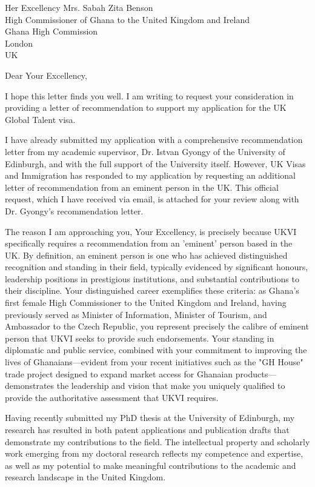 \documentclass[12pt,a4paper]{letter}
\begin{document}
\begin{letter}{Her Excellency Mrs. Sabah Zita Benson\\High Commissioner of Ghana to the United Kingdom and Ireland\\Ghana High Commission\\London\\UK}

\date{\today}

\opening{Dear Your Excellency,}

I hope this letter finds you well. I am writing to request your consideration in providing a letter of recommendation to support my application for the UK Global Talent visa.

I have already submitted my application with a comprehensive recommendation letter from my academic supervisor, Dr. Istvan Gyongy of the University of Edinburgh, and with the full support of the University itself. However, UK Visas and Immigration has responded to my application by requesting an additional letter of recommendation from an eminent person in the UK. This official request, which I have received via email, is attached for your review along with Dr. Gyongy's recommendation letter.

The reason I am approaching you, Your Excellency, is precisely because UKVI specifically requires a recommendation from an 'eminent' person based in the UK. By definition, an eminent person is one who has achieved distinguished recognition and standing in their field, typically evidenced by significant honours, leadership positions in prestigious institutions, and substantial contributions to their discipline. Your distinguished career exemplifies these criteria: as Ghana's first female High Commissioner to the United Kingdom and Ireland, having previously served as Minister of Information, Minister of Tourism, and Ambassador to the Czech Republic, you represent precisely the calibre of eminent person that UKVI seeks to provide such endorsements. Your standing in diplomatic and public service, combined with your commitment to improving the lives of Ghanaians—evident from your recent initiatives such as the "GH House" trade project designed to expand market access for Ghanaian products—demonstrates the leadership and vision that make you uniquely qualified to provide the authoritative assessment that UKVI requires.

Having recently submitted my PhD thesis at the University of Edinburgh, my research has resulted in both patent applications and publication drafts that demonstrate my contributions to the field. The intellectual property and scholarly work emerging from my doctoral research reflects my competence and expertise, as well as my potential to make meaningful contributions to the academic and research landscape in the United Kingdom.


\end{letter}
\end{document}
